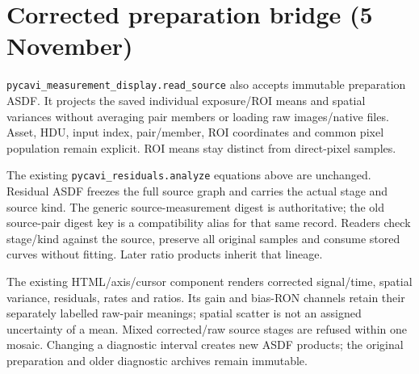 \documentclass[10pt,a4paper]{article}
\begin{document}
\section{Corrected preparation bridge (5 November)}
\texttt{pycavi\_measurement\_display.read\_source} also accepts immutable
preparation ASDF. It projects the saved individual exposure/ROI means and
spatial variances without averaging pair members or loading raw images/native
files. Asset, HDU, input index, pair/member, ROI coordinates and common pixel
population remain explicit. ROI means stay distinct from direct-pixel samples.

The existing \texttt{pycavi\_residuals.analyze} equations above are unchanged.
Residual ASDF freezes the full source graph and carries the actual stage and
source kind. The generic source-measurement digest is authoritative; the old
source-pair digest key is a compatibility alias for that same record. Readers
check stage/kind against the source, preserve all original samples and consume
stored curves without fitting. Later ratio products inherit that lineage.

The existing HTML/axis/cursor component renders corrected signal/time,
spatial variance, residuals, rates and ratios. Its gain and bias-RON channels
retain their separately labelled raw-pair meanings; spatial scatter is not an
assigned uncertainty of a mean. Mixed corrected/raw source stages are refused
within one mosaic. Changing a diagnostic interval creates new ASDF products;
the original preparation and older diagnostic archives remain immutable.
\end{document}

